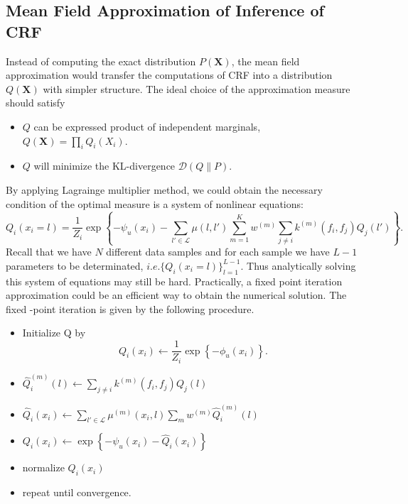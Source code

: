 \documentclass{article}
\numberwithin{equation}{section}
\newcommand{\1}{\boldsymbol{1}}
\begin{document}
\subsection{Mean Field Approximation of Inference of CRF}
	 Instead of computing the exact distribution $P(\mathbf{X})$, the mean field approximation would transfer the computations of CRF into a distribution $Q(\mathbf{X})$ with simpler structure.
	 The ideal choice of the approximation measure should satisfy \begin{itemize}
	 \item $Q$ can be expressed product of independent marginals, $Q(\mathbf{X}) = \prod_i Q_i(X_i)$.
	 \item $Q$ will minimize the KL-divergence $\mathcal{D}(Q\|P)$.
	\end{itemize}
	 By applying Lagrainge multiplier method, we could obtain the necessary condition of the optimal measure is a system of nonlinear equations:
	\[
	    Q_i(x_i = l) = \frac{1}{Z_i} \exp \left\{ -\psi_u(x_i) - \sum_{l' \in \mathcal{L}} \mu(l, l') \sum_{m=1}^K w^{(m)} \sum_{j \neq i} k^{(m)}(f_i, f_j) Q_j(l') \right\}.
	\]
	Recall that we have $N$ different data samples and for each sample we have $L-1$ parameters to be determinated, $i.e. \{Q_{i}(x_i = l)\}_{l = 1}^{L-1}$. 
	Thus analytically solving this system of equations may still be hard. Practically, a fixed point iteration approximation could be an efficient way to obtain the numerical solution.
	The fixed -point iteration is given by the following procedure.
	\begin{itemize}
		\item Initialize Q by \[
	  Q_i(x_i) \leftarrow \frac{1}{Z_i} \exp\left\{-\phi_u(x_i)\right\}.
		\]
		\item $\hat{Q}_i^{(m)}(l) \gets \sum_{j \neq i} k^{(m)}(f_i, f_j) Q_j(l)$\;
		\item $\hat{Q}_i(x_i) \gets \sum_{l' \in \mathcal{L}} \mu^{(m)}(x_i, l) \sum_m w^{(m)} \hat{Q}_i^{(m)}(l)$\;
		\item $Q_i(x_i) \gets \exp \left\{-\psi_u(x_i) - \hat{Q}_i(x_i) \right\}$\;
		\item 
		    normalize $Q_i(x_i)$\;
		\item repeat until convergence.
	      \end{itemize}
\end{document}

